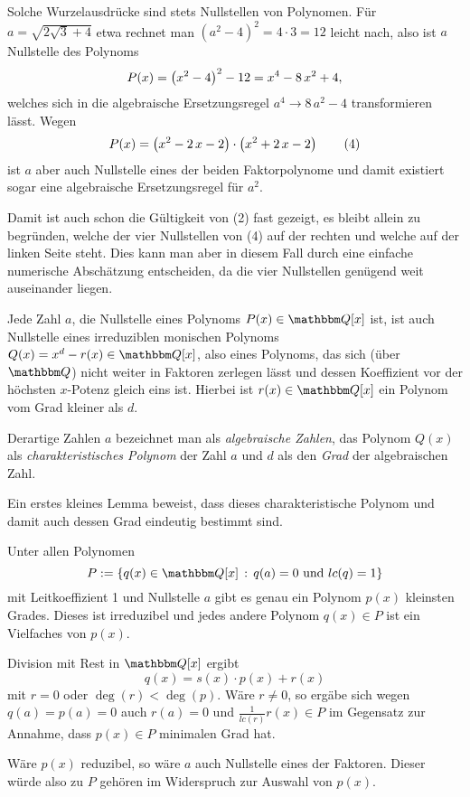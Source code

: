 \documentclass[11pt,a4paper]{article}
\begin{document}
Solche Wurzelausdrücke sind stets Nullstellen von Polynomen. Für
$a=\sqrt{2\sqrt{3}+4}$ etwa rechnet man $(a^2-4)^2=4\cdot 3=12$ leicht nach,
also ist $a$ Nullstelle des Polynoms 
\begin{gather*}
  P(x)=\left(x^2-4\right)^2-12=x^4-8\,x^2+4,
\end{gather*}
welches sich in die algebraische Ersetzungsregel $a^4\to 8\,a^2-4$
transformieren lässt.  Wegen
\begin{gather*}
  P(x)=\left(x^2-2\,x-2\right)\cdot\left(x^2+2\,x-2\right)\tag{4}
\end{gather*}
ist $a$ aber auch Nullstelle eines der beiden Faktorpolynome und damit
existiert sogar eine algebraische Ersetzungsregel für $a^2$.  

Damit ist auch schon die Gültigkeit von (2) fast gezeigt, es bleibt allein zu
begründen, welche der vier Nullstellen von (4) auf der rechten und welche auf
der linken Seite steht. Dies kann man aber in diesem Fall durch eine einfache
numerische Abschätzung entscheiden, da die vier Nullstellen genügend weit
auseinander liegen.

Jede Zahl $a$, die Nullstelle eines Polynoms $P(x)\in\Q[x]$ ist, ist auch
Nullstelle eines irreduziblen monischen Polynoms $Q(x)=x^d-r(x)\in\Q[x]$, also
eines Polynoms, das sich (über $\Q$) nicht weiter in Faktoren zerlegen lässt
und dessen Koeffizient vor der höchsten $x$-Potenz gleich eins ist.  Hierbei
ist $r(x)\in\Q[x]$ ein Polynom vom Grad kleiner als $d$.

Derartige Zahlen $a$ bezeichnet man als \emph{algebraische Zahlen}, das Polynom
$Q(x)$ als \emph{charakteristisches Polynom} der Zahl $a$ und $d$ als den
\emph{Grad} der algebraischen Zahl.

Ein erstes kleines Lemma beweist, dass dieses charakteristische Polynom und
damit auch dessen Grad eindeutig bestimmt sind.
\begin{lemma}
Unter allen Polynomen
\[P:=\{q(x)\in \Q[x]\,:\,q(a)=0 \text{ und } lc(q)=1\}\]
mit Leitkoeffizient 1 und Nullstelle $a$ gibt es genau ein Polynom $p(x)$
kleinsten Grades.  Dieses ist irreduzibel und jedes andere Polynom $q(x)\in P$
ist ein Vielfaches von $p(x)$.
\end{lemma}

\begin{beweis} Division mit Rest in $\Q[x]$ ergibt 
\[q(x)=s(x)\cdot p(x) + r(x)\]
mit $r=0$ oder $\deg(r)<\deg(p)$. Wäre $r\neq 0$, so ergäbe sich wegen
$q(a)=p(a)=0$ auch $r(a)=0$ und $\frac{1}{lc(r)}r(x)\in P$ im Gegensatz zur
Annahme, dass $p(x)\in P$ minimalen Grad hat.

Wäre $p(x)$ reduzibel, so wäre $a$ auch Nullstelle eines der Faktoren.  Dieser
würde also zu $P$ gehören im Widerspruch zur Auswahl von $p(x)$.
\end{beweis}
\end{document}
